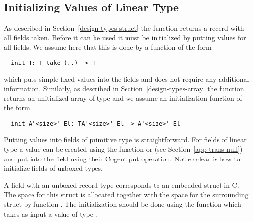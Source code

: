 \subsection{Initializing Values of Linear Type}
\label{app-trans-init}

As described in Section~\ref{design-types-struct} the function  returns a record with all fields taken.
Before it can be used it must be initialized by putting values for all fields. We assume here that this is done by a 
function of the form
\begin{verbatim}
  init_T: T take (..) -> T
\end{verbatim}
which puts simple fixed values into the fields and does not require any additional information.
Similarly, as described in Section~\ref{design-types-array} the function  returns an 
unitialized array of type  and we assume an initialization function of the form
\begin{verbatim}
  init_A'<size>'_El: TA'<size>'_El -> A'<size>'_El
\end{verbatim}

Putting values into fields of primitive type is straightforward. For fields of linear type  a value can be created 
using the function  or  (see Section~\ref{app-trans-null}) and put into the field using their
Cogent put operation. Not so clear is how to initialize fields of unboxed types.

A field  with an unboxed record type  corresponds to an embedded struct in C. The space for this struct is allocated together
with the space for the surrounding struct by function . The initialization should be done using the 
function  which takes as input a value of type . 

